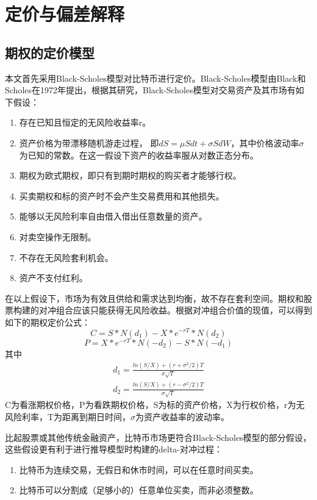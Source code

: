 \chapter{定价与偏差解释}\label{research_method}
\section{期权的定价模型}\label{pricing_model}
本文首先采用Black-Scholes模型对比特币进行定价。Black-Scholes模型由Black和Scholes在1972年提出\cite{J-1972}，根据其研究，Black-Scholes模型对交易资产及其市场有如下假设：
\begin{enumerate}[(1)]
\item 存在已知且恒定的无风险收益率r。
\item 资产价格为带漂移随机游走过程， 即$dS={\mu}Sdt+{\sigma}SdW$，其中价格波动率$\sigma$为已知的常数。在这一假设下资产的收益率服从对数正态分布。
\item 期权为欧式期权，即只有到期时期权的购买者才能够行权。
\item 买卖期权和标的资产时不会产生交易费用和其他损失。
\item 能够以无风险利率自由借入借出任意数量的资产。
\item 对卖空操作无限制。
\item 不存在无风险套利机会。
\item 资产不支付红利。
\end{enumerate} 
在以上假设下，市场为有效且供给和需求达到均衡，故不存在套利空间。期权和股票构建的对冲组合应该只能获得无风险收益。根据对冲组合价值的现值，可以得到如下的期权定价公式：
\begin{equation}\label{bs-call}
C=S*N(d_1)-X*e^{-rT}*N(d_2) 
\end{equation}
\begin{equation}\label{bs-put}
P=X*e^{-rT}*N(-d_2)-S*N(-d_1)
\end{equation}
其中
\begin{equation*}
\begin{split}
d_1=\frac{ln(S/X)+(r+\sigma^2/2)T}{\sigma{\sqrt{T}}} \\
d_2=\frac{ln(S/X)+(r-\sigma^2/2)T}{\sigma{\sqrt{T}}}
\end{split}
\end{equation*}
C为看涨期权价格，P为看跌期权价格，S为标的资产价格，X为行权价格，r为无风险利率，T为距离到期日时间，$\sigma$为资产收益率的波动率。

比起股票或其他传统金融资产，比特币市场更符合Black-Scholes模型的部分假设，这些假设更有利于进行推导模型时构建的delta-对冲过程：
\begin{enumerate}[(1)]
\item 比特币为连续交易，无假日和休市时间，可以在任意时间买卖。
\item 比特币可以分割成（足够小的）任意单位买卖，而非必须整数。
\end{enumerate}
 
